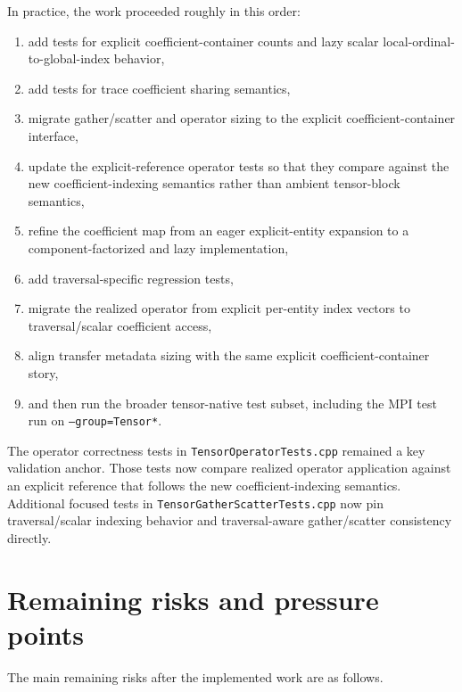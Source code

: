 \documentclass[11pt]{article}
\begin{document}
In practice, the work proceeded roughly in this order:
\begin{enumerate}[leftmargin=2em]
\item add tests for explicit coefficient-container counts and lazy scalar local-ordinal-to-global-index behavior,
\item add tests for trace coefficient sharing semantics,
\item migrate gather/scatter and operator sizing to the explicit coefficient-container interface,
\item update the explicit-reference operator tests so that they compare against the new coefficient-indexing semantics rather than ambient tensor-block semantics,
\item refine the coefficient map from an eager explicit-entity expansion to a component-factorized and lazy implementation,
\item add traversal-specific regression tests,
\item migrate the realized operator from explicit per-entity index vectors to traversal/scalar coefficient access,
\item align transfer metadata sizing with the same explicit coefficient-container story,
\item and then run the broader tensor-native test subset, including the MPI test run on \texttt{--group=Tensor*}.
\end{enumerate}

The operator correctness tests in \texttt{TensorOperatorTests.cpp} remained a key validation anchor.  Those tests now compare realized operator application against an explicit reference that follows the new coefficient-indexing semantics.  Additional focused tests in \texttt{TensorGatherScatterTests.cpp} now pin traversal/scalar indexing behavior and traversal-aware gather/scatter consistency directly.

\section{Remaining risks and pressure points}

The main remaining risks after the implemented work are as follows.
\end{document}
